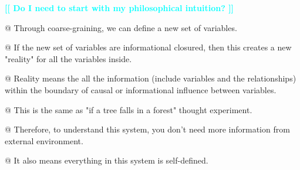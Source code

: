 \documentclass[utf8]{article}
\newenvironment{ants}
			{
			 \begin{easylist}[itemize]		
		 	}
			{
			\end{easylist}
			}
\newcommand{\toWrite}[1]{\noindent
			\textcolor{Cyan}{\textbf{[[ #1 ]]}}}
\begin{document}
		
		\begin{ants}
			\toWrite{Do I need to start with my philosophical intuition?}
			
			@ Through coarse-graining, we can define a new set of variables.
			
			@ If the new set of variables are informational closured, then this creates a new "reality" for all the variables inside. 
			
			@ Reality means the all the information (include variables and the relationships) within the boundary of causal or informational influence between variables.
			
			@ This is the same as "if a tree falls in a forest" thought experiment. 
			
			@ Therefore, to understand this system, you don't need more information from external environment.
			
			@ It also means everything in this system is self-defined. 
			
			
		\end{ants}
		
		
		
		
		
\end{document}
